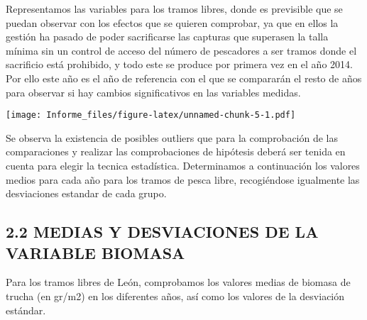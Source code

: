 \documentclass[
]{article}
\begin{document}
Representamos las variables para los tramos libres, donde es previsible
que se puedan observar con los efectos que se quieren comprobar, ya que
en ellos la gestión ha pasado de poder sacrificarse las capturas que
superasen la talla mínima sin un control de acceso del número de
pescadores a ser tramos donde el sacrificio está prohibido, y todo este
se produce por primera vez en el año 2014. Por ello este año es el año
de referencia con el que se compararán el resto de años para observar si
hay cambios significativos en las variables medidas.

\texttt{[image: Informe\_files/figure-latex/unnamed-chunk-5-1.pdf]}

Se observa la existencia de posibles outliers que para la comprobación
de las comparaciones y realizar las comprobaciones de hipótesis deberá
ser tenida en cuenta para elegir la tecnica estadística. Determinamos a
continuación los valores medios para cada año para los tramos de pesca
libre, recogiéndose igualmente las desviaciones estandar de cada grupo.

\hypertarget{medias-y-desviaciones-de-la-variable-biomasa}{%
\subsection{2.2 MEDIAS Y DESVIACIONES DE LA VARIABLE
BIOMASA}\label{medias-y-desviaciones-de-la-variable-biomasa}}

Para los tramos libres de León, comprobamos los valores medias de
biomasa de trucha (en gr/m2) en los diferentes años, así como los
valores de la desviación estándar.
\end{document}
